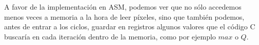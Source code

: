 A favor de la implementación en ASM, podemos ver que no sólo accedemos menos veces a memoria a la hora de leer píxeles, sino que también podemos, antes de entrar a los ciclos, guardar en registros algunos valores que el código C buscaría en cada iteración dentro de la memoria, como por ejemplo $max$ o $Q$.
